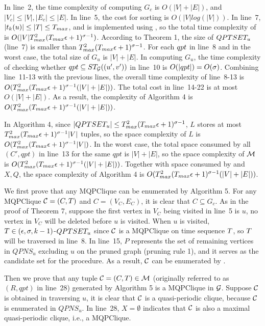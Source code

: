 \documentclass[conference]{IEEEtran}
\newcommand{\subqpslimit}{Theorem 1\xspace}
\newcommand{\mqpcore}{Algorithm 4\xspace}
\newcommand{\mqpclique}{Algorithm 5\xspace}
\newcommand{\mqpcorecorrect}{Theorem 7\xspace}
\begin{document}
	 In line~2, the time complexity of computing $ G_c $ is $ O(|V|+|E|) $, and $ |V_c|\leq |V|, |E_c|\leq |E| $. In line~5, the cost for sorting is $ O(|V|log(|V|)) $. In line~7, $ |t_k(u)|\leq |T|\leq T_{max} $, and  is implemented using \kw{\qpts+}, so the total time complexity of  is $ O(|V|T_{max}^2(T_{max}\epsilon+1)^{\sigma-1}) $. According to \subqpslimit, the size of $ QPTSET_u $ (line~7) is smaller than $ T_{max}^2(T_{max}\epsilon+1)^{\sigma-1} $. For each $ qpt $ in line~8 and in the worst case, the total size of $ G_u $ is $ |V|+|E| $. In computing $ G_u $, the time complexity of checking whether $ qpt\subseteq ST_{\mathcal{G}}((u',v')) $ in line~10 is $ O(|qpt|)=O(\sigma) $. Combining line~11-13 with the previous lines, the overall time complexity of line~8-13 is $ O(T_{max}^2(T_{max}\epsilon+1)^{\sigma-1}(|V|+|E|)) $. The total cost in line~14-22 is at most $ O(|V|+|E|) $. As a result, the complexity of \mqpcore is $ O(T_{max}^2(T_{max}\epsilon+1)^{\sigma-1}(|V|+|E|)) $.
	
	In \mqpcore, since $ |QPTSET_u|\leq T_{max}^2(T_{max}\epsilon+1)^{\sigma-1} $, $ L $ stores at most $ T_{max}^2(T_{max}\epsilon+1)^{\sigma-1}|V| $ tuples, so the space complexity of $ L $ is $ O(T_{max}^2(T_{max}\epsilon+1)^{\sigma-1}|V|) $. In the worst case, the total space consumed by all $ (C',qpt) $ in line~13 for the same $ qpt $ is $ |V|+|E| $, so the space complexity of $ \mathcal{M} $ is $ O(T_{max}^2(T_{max}\epsilon+1)^{\sigma-1}(|V|+|E|)) $. Together with space consumed by  and $ X,Q $, the space complexity of \mqpcore is $ O(T_{max}^2(T_{max}\epsilon+1)^{\sigma-1}(|V|+|E|)) $.
	
	 We first prove that any MQPClique can be enumerated by \mqpclique. For any MQPClique $ \mathcal{C}=(C,T) $ and $ C=(V_C,E_C) $, it is clear that $ C\subseteq G_c $. As in the proof of \mqpcorecorrect, suppose the first vertex in $ V_C $ being visited in line~5 is $ u $, no vertex in $ V_C $ will be deleted before $ u $ is visited. When $ u $ is visited, $ T\in (\epsilon,\sigma,k-1)$-$QPTSET_u $ since $ \mathcal{C} $ is a MQPClique on time sequence $ T $, so $ T $ will be traversed in line~8. In line~15, $ P $ represents the set of remaining vertices in $ QPNS_u $ excluding $ u $ on the pruned graph (pruning rule 1), and it serves as the candidate set for the  procedure. As a result, $ \mathcal{C} $ can be enumerated by .
	
	Then we prove that any tuple $ \mathcal{C}=(C,T)\in \mathcal{M} $ (originally referred to as $ (R,qpt) $ in line~28) generated by \mqpclique is a MQPClique in $ \mathcal{G} $. Suppose $ \mathcal{C} $ is obtained in traversing $ u $, it is clear that $ \mathcal{C} $ is a quasi-periodic clique, because $ \mathcal{C} $ is enumerated in $ QPNS_u $. In line~28, $ X=\emptyset $ indicates that $ \mathcal{C} $ is also a maximal quasi-periodic clique, i.e., a MQPClique.
	
\end{document}
